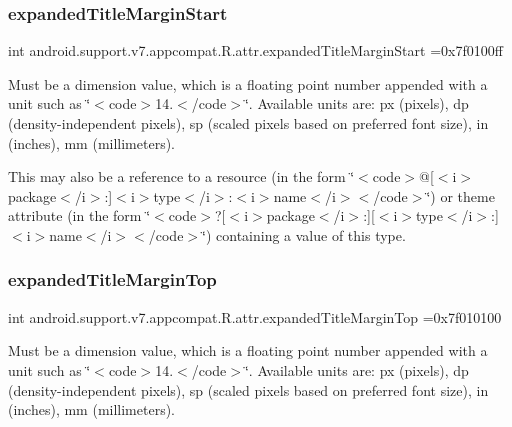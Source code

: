 \subsubsection{\texorpdfstring{expanded\+Title\+Margin\+Start}{expandedTitleMarginStart}}
{\footnotesize\ttfamily int android.\+support.\+v7.\+appcompat.\+R.\+attr.\+expanded\+Title\+Margin\+Start =0x7f0100ff\hspace{0.3cm}{\ttfamily [static]}}

Must be a dimension value, which is a floating point number appended with a unit such as \char`\"{}$<$code$>$14.\+5sp$<$/code$>$\char`\"{}. Available units are\+: px (pixels), dp (density-\/independent pixels), sp (scaled pixels based on preferred font size), in (inches), mm (millimeters). 

This may also be a reference to a resource (in the form \char`\"{}$<$code$>$@\mbox{[}$<$i$>$package$<$/i$>$\+:\mbox{]}$<$i$>$type$<$/i$>$\+:$<$i$>$name$<$/i$>$$<$/code$>$\char`\"{}) or theme attribute (in the form \char`\"{}$<$code$>$?\mbox{[}$<$i$>$package$<$/i$>$\+:\mbox{]}\mbox{[}$<$i$>$type$<$/i$>$\+:\mbox{]}$<$i$>$name$<$/i$>$$<$/code$>$\char`\"{}) containing a value of this type. \mbox{\label{classandroid_1_1support_1_1v7_1_1appcompat_1_1R_1_1attr_a4d409c6027fc796e437be31b11a4cfaf}} 
\subsubsection{\texorpdfstring{expanded\+Title\+Margin\+Top}{expandedTitleMarginTop}}
{\footnotesize\ttfamily int android.\+support.\+v7.\+appcompat.\+R.\+attr.\+expanded\+Title\+Margin\+Top =0x7f010100\hspace{0.3cm}{\ttfamily [static]}}

Must be a dimension value, which is a floating point number appended with a unit such as \char`\"{}$<$code$>$14.\+5sp$<$/code$>$\char`\"{}. Available units are\+: px (pixels), dp (density-\/independent pixels), sp (scaled pixels based on preferred font size), in (inches), mm (millimeters). 

